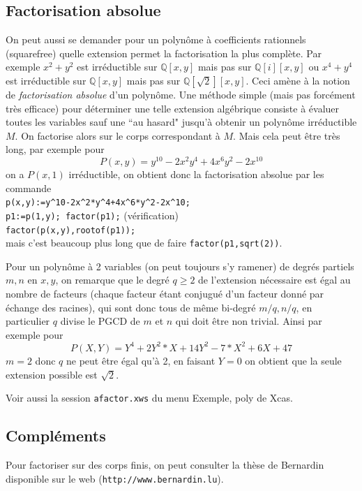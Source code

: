 \documentclass[a4paper,11pt]{article}
\begin{document}
\begin{giacjshere}
\subsection{Factorisation absolue} \label{sec:factorisation_absolue}
On peut aussi se demander pour un polyn\^ome \`a coefficients
rationnels (squarefree) quelle extension 
permet la factorisation la plus
compl\`ete. Par exemple $x^2+y^2$ est irr\'eductible sur $\mathbb{Q}[x,y]$
mais pas sur $\mathbb{Q}[i][x,y]$ ou $x^4+y^4$ est irr\'eductible sur $\mathbb{Q}[x,y]$
mais pas sur $\mathbb{Q}[\sqrt{2}][x,y]$. Ceci am\`ene \`a la notion
de {\em factorisation absolue} d'un polyn\^ome. Une m\'ethode simple
(mais pas forc\'ement tr\`es efficace) pour d\'eterminer une telle
extension alg\'ebrique consiste \`a \'evaluer toutes les variables
sauf une ``au hasard" jusqu'\`a obtenir un polyn\^ome irr\'eductible $M$.
On factorise alors sur le corps correspondant \`a $M$. Mais cela
peut \^etre tr\`es long, par exemple pour 
\[ P(x,y)=y^{10}-2x^2y^4+4x^6y^2-2x^{10}\]
on a $P(x,1)$ irr\'eductible, on obtient donc la factorisation
absolue par les commande\\
\verb|p(x,y):=y^10-2x^2*y^4+4x^6*y^2-2x^10;|\\
\verb|p1:=p(1,y); factor(p1);| (v\'erification)\\
\verb|factor(p(x,y),rootof(p1));|\\
mais c'est beaucoup plus long que de faire \verb|factor(p1,sqrt(2))|.

Pour un polyn\^ome \`a 2 variables (on peut toujours s'y ramener) de
degr\'es partiels $m,n$ en $x,y$,
on remarque que le degr\'e $q \geq 2$ de l'extension n\'ecessaire est
\'egal au nombre de facteurs (chaque facteur \'etant conjugu\'e d'un
facteur donn\'e par \'echange des racines), qui sont donc tous de m\^eme
bi-degr\'e $m/q,n/q$, en particulier $q$ divise le PGCD de $m$ et $n$
qui doit \^etre non trivial. Ainsi par exemple pour 
$$ P(X,Y)=Y^4 +2Y^2*X+14Y^2 -7*X^2 +6X+47$$
$m=2$ donc $q$ ne peut \^etre \'egal qu'\`a 2, en faisant $Y=0$ on
obtient que la seule extension possible est $\sqrt{2}$.

Voir aussi la session \verb|afactor.xws| du menu Exemple, poly de Xcas.

\subsection{Compl\'ements}
Pour factoriser sur des corps finis, on peut consulter la thèse
de Bernardin disponible sur le web (\verb|http://www.bernardin.lu|).


\end{giacjshere}
\end{document}
